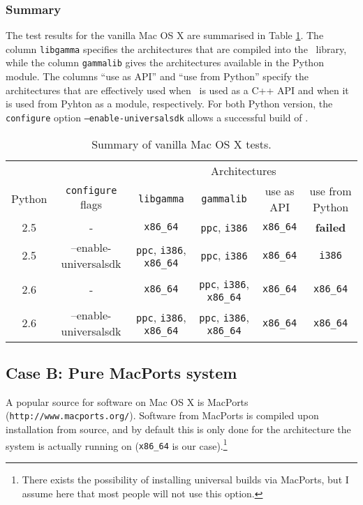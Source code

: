 \documentclass{article}[12pt,a4]
\begin{document}
\subsubsection{Summary}

The test results for the vanilla Mac OS X are summarised in Table \ref{table:vanilla}.
The column {\tt libgamma} specifies the architectures that are compiled into the \this\
library, while the column {\tt gammalib} gives the architectures available in the
Python module.
The columns ``use as API'' and ``use from Python'' specify the architectures that are effectively
used when \this\ is used as a C++ API and when it is used from Pyhton as a module, respectively.
For both Python version, the {\tt configure} option {\tt --enable-universalsdk} allows a successful
build of \this.

\begin{table}[!h]
  \small
  \center
  \begin{tabular}{cc|cccc}
  \hline
   & & \multicolumn{4}{c}{Architectures} \\
  Python & {\tt configure} flags & {\tt libgamma} & {\tt gammalib} & use as API & use from Python \\
  \hline
  2.5 & - & {\tt x86\_64} & {\tt ppc}, {\tt i386} & {\tt x86\_64} & {\bf failed} \\
  2.5 & --enable-universalsdk & {\tt ppc}, {\tt i386}, {\tt x86\_64} & {\tt ppc}, {\tt i386} & {\tt x86\_64} & {\tt i386} \\
  2.6 & - & {\tt x86\_64} & {\tt ppc}, {\tt i386}, {\tt x86\_64} & {\tt x86\_64} & {\tt x86\_64} \\
  2.6 & --enable-universalsdk & {\tt ppc}, {\tt i386}, {\tt x86\_64} & {\tt ppc}, {\tt i386}, {\tt x86\_64} & {\tt x86\_64} & {\tt x86\_64} \\
  \hline
  \end{tabular}
  \caption{Summary of vanilla Mac OS X tests.}
  \label{table:vanilla}
\end{table}


\subsection{Case B: Pure MacPorts system}

A popular source for software on Mac OS X is MacPorts ({\tt http://www.macports.org/}).
Software from MacPorts is compiled upon installation from source, and by default this is only
done for the architecture the system is actually running on ({\tt x86\_64} is our case).\footnote{
There exists the possibility of installing universal builds via MacPorts, but I assume here that 
most people will not use this option.}
\end{document}
